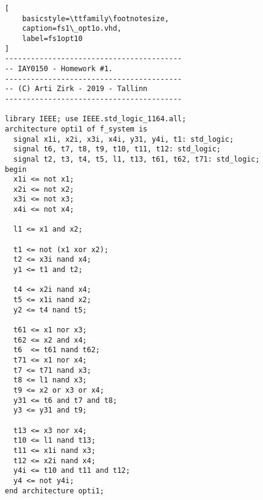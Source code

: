 \begin{lstlisting}[
    basicstyle=\ttfamily\footnotesize,
    caption=fs1\_opt1o.vhd,
    label=fs1opt10
]
-----------------------------------------
-- IAY0150 - Homework #1.
-----------------------------------------
-- (C) Arti Zirk - 2019 - Tallinn
-----------------------------------------

library IEEE; use IEEE.std_logic_1164.all;
architecture opti1 of f_system is
  signal x1i, x2i, x3i, x4i, y31, y4i, t1: std_logic;
  signal t6, t7, t8, t9, t10, t11, t12: std_logic;
  signal t2, t3, t4, t5, l1, t13, t61, t62, t71: std_logic;
begin
  x1i <= not x1;
  x2i <= not x2;
  x3i <= not x3;
  x4i <= not x4;

  l1 <= x1 and x2;

  t1 <= not (x1 xor x2);
  t2 <= x3i nand x4;
  y1 <= t1 and t2;

  t4 <= x2i nand x4;
  t5 <= x1i nand x2;
  y2 <= t4 nand t5;

  t61 <= x1 nor x3;
  t62 <= x2 and x4;
  t6  <= t61 nand t62;
  t71 <= x1 nor x4;
  t7 <= t71 nand x3;
  t8 <= l1 nand x3;
  t9 <= x2 or x3 or x4;
  y31 <= t6 and t7 and t8;
  y3 <= y31 and t9;

  t13 <= x3 nor x4;
  t10 <= l1 nand t13;
  t11 <= x1i nand x3;
  t12 <= x2i nand x4;
  y4i <= t10 and t11 and t12;
  y4 <= not y4i;
end architecture opti1;
\end{lstlisting}


